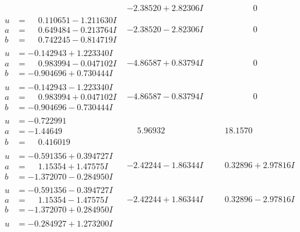 \documentclass[1p]{elsarticle_modified}
\theoremstyle{definition}
\begin{document}
$$\begin{array}{c|c|c}
 & -2.38520 + 2.82306 I & \phantom{-0.000000 } 0 \\ \hline\begin{aligned}
u &= \phantom{-}0.110651 - 1.211630 I \\
a &= \phantom{-}0.649484 - 0.213764 I \\
b &= \phantom{-}0.742245 - 0.814719 I\end{aligned}
 & -2.38520 - 2.82306 I & \phantom{-0.000000 } 0 \\ \hline\begin{aligned}
u &= -0.142943 + 1.223340 I \\
a &= \phantom{-}0.983994 - 0.047102 I \\
b &= -0.904696 + 0.730444 I\end{aligned}
 & -4.86587 + 0.83794 I & \phantom{-0.000000 } 0 \\ \hline\begin{aligned}
u &= -0.142943 - 1.223340 I \\
a &= \phantom{-}0.983994 + 0.047102 I \\
b &= -0.904696 - 0.730444 I\end{aligned}
 & -4.86587 - 0.83794 I & \phantom{-0.000000 } 0 \\ \hline\begin{aligned}
u &= -0.722991\phantom{ +0.000000I} \\
a &= -1.44649\phantom{ +0.000000I} \\
b &= \phantom{-}0.416019\phantom{ +0.000000I}\end{aligned}
 & \phantom{-}5.96932\phantom{ +0.000000I} & \phantom{-}18.1570\phantom{ +0.000000I} \\ \hline\begin{aligned}
u &= -0.591356 + 0.394727 I \\
a &= \phantom{-}1.15354 + 1.47575 I \\
b &= -1.372070 - 0.284950 I\end{aligned}
 & -2.42244 - 1.86344 I & \phantom{-}0.32896 + 2.97816 I \\ \hline\begin{aligned}
u &= -0.591356 - 0.394727 I \\
a &= \phantom{-}1.15354 - 1.47575 I \\
b &= -1.372070 + 0.284950 I\end{aligned}
 & -2.42244 + 1.86344 I & \phantom{-}0.32896 - 2.97816 I \\ \hline\begin{aligned}
u &= -0.284927 + 1.273200 I \\

\end{aligned}
\end{array}$$
\end{document}
